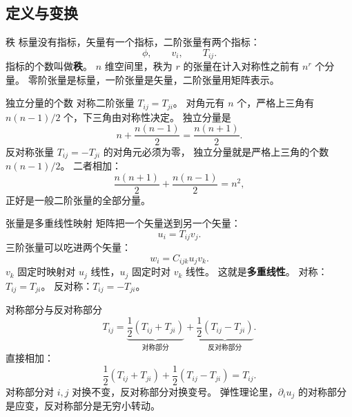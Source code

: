 \documentclass[fontset=windows, chinese, 10pt, xcolor=dvipsnames]{beamer}
\begin{document}
\subsection{定义与变换}

\begin{frame}{秩}
  标量没有指标，矢量有一个指标，二阶张量有两个指标：
  \begin{equation*}
    \phi,
    \qquad
    v_i,
    \qquad
    T_{ij}.
  \end{equation*}
  指标的个数叫做\textbf{秩}。
  $n$ 维空间里，秩为 $r$ 的张量在计入对称性之前有 $n^r$ 个分量。
  零阶张量是标量，一阶张量是矢量，二阶张量用矩阵表示。
\end{frame}

\begin{frame}{独立分量的个数}
  对称二阶张量 $T_{ij}=T_{ji}$。
  对角元有 $n$ 个，严格上三角有 $n(n-1)/2$ 个，下三角由对称性决定。
  独立分量是
  \begin{equation*}
    n+\frac{n(n-1)}{2}
    =\frac{n(n+1)}{2}.
  \end{equation*}
  反对称张量 $T_{ij}=-T_{ji}$ 的对角元必须为零，
  独立分量就是严格上三角的个数 $n(n-1)/2$。
  二者相加：
  \begin{equation*}
    \frac{n(n+1)}{2}+\frac{n(n-1)}{2}
    =n^2,
  \end{equation*}
  正好是一般二阶张量的全部分量。
\end{frame}

\begin{frame}{张量是多重线性映射}
  矩阵把一个矢量送到另一个矢量：
  \begin{equation*}
    u_i=T_{ij}v_j.
  \end{equation*}
  三阶张量可以吃进两个矢量：
  \begin{equation*}
    w_i=C_{ijk}u_j v_k.
  \end{equation*}
  $v_k$ 固定时映射对 $u_j$ 线性，$u_j$ 固定时对 $v_k$ 线性。
  这就是\textbf{多重线性}。
  \vspace{0.4em}
  对称：$T_{ij}=T_{ji}$。
  反对称：$T_{ij}=-T_{ji}$。
\end{frame}

\begin{frame}{对称部分与反对称部分}
  \begin{equation*}
    T_{ij}
    =\underbrace{\frac12(T_{ij}+T_{ji})}_{\text{对称部分}}
    +\underbrace{\frac12(T_{ij}-T_{ji})}_{\text{反对称部分}}.
  \end{equation*}
  直接相加：
  \begin{equation*}
    \frac12(T_{ij}+T_{ji})+\frac12(T_{ij}-T_{ji})
    =T_{ij}.
  \end{equation*}
  对称部分对 $i,j$ 对换不变，反对称部分对换变号。
  弹性理论里，$\partial_i u_j$ 的对称部分是应变，反对称部分是无穷小转动。
\end{frame}
\end{document}
